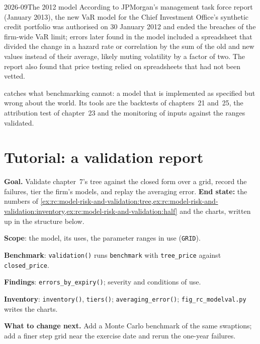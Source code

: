 \begin{dated}{2026-09}{The 2012 model}\label{dat:rc:model-risk-and-validation:cio}
According to JPMorgan's management task force report (January 2013), the new VaR model for the Chief
Investment Office's synthetic credit portfolio was authorised on 30 January 2012 and ended the breaches
of the firm-wide VaR limit; errors later found in the model included a spreadsheet that divided the
change in a hazard rate or correlation by the sum of the old and new values instead of their average,
likely muting volatility by a factor of two. The report also found that price testing relied on
spreadsheets that had not been vetted.
\end{dated}

 catches what benchmarking cannot: a model that is implemented as specified but
wrong about the world. Its tools are the backtests of chapters~21 and~25, the attribution test of
chapter~23 and the monitoring of inputs against the ranges validated.

\section{Tutorial: a validation report}\label{tut:rc:model-risk-and-validation:tutorial}

\begin{tutorial}
\textbf{Goal.} Validate chapter~7's tree against the closed form over a grid, record the failures,
tier the firm's models, and replay the averaging error. \textbf{End state:} the numbers of
\cref{ex:rc:model-risk-and-validation:tree,ex:rc:model-risk-and-validation:inventory,ex:rc:model-risk-and-validation:half}
and the charts, written up in the structure below.
\begin{tutsteps}
\item \textbf{Scope}: the model, its uses, the parameter ranges in use (\texttt{GRID}).
\item \textbf{Benchmark}: \texttt{validation()} runs \texttt{benchmark} with \texttt{tree\_price} against \texttt{closed\_price}.
\item \textbf{Findings}: \texttt{errors\_by\_expiry()}; severity and conditions of use.
\item \textbf{Inventory}: \texttt{inventory()}, \texttt{tiers()}; \texttt{averaging\_error()};
\texttt{fig\_rc\_modelval.py} writes the charts.
\end{tutsteps}
\textbf{What to change next.} Add a Monte Carlo benchmark of the same swaptions; add a finer step
grid near the exercise date and rerun the one-year failures.
\end{tutorial}

